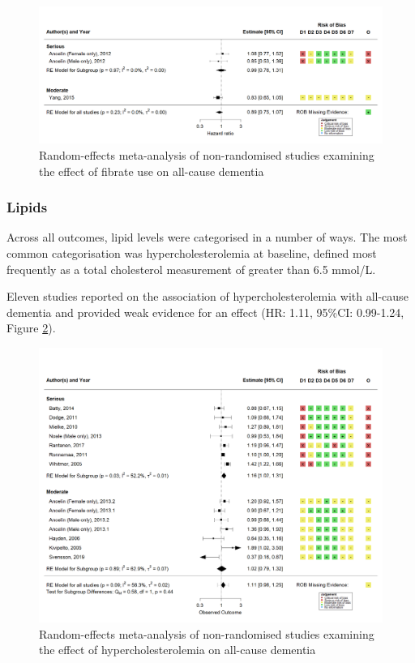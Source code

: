 \documentclass[a4paper, twoside]{templates/ociamthesis}
\begin{document}
\begin{figure}[H]
\includegraphics[width=1\linewidth]{figures/sys-rev/fp_obs_Fibrate_Dementia} \caption[Random-effects meta-analysis of statins on all-cause dementia]{Random-effects meta-analysis of non-randomised studies examining the effect of fibrate use on all-cause dementia}\label{fig:obsFibrateDementiaFig}
\end{figure}

\hypertarget{lipids}{%
\subsubsection{Lipids}\label{lipids}}

Across all outcomes, lipid levels were categorised in a number of ways. The most common categorisation was hypercholesterolemia at baseline, defined most frequently as a total cholesterol measurement of greater than 6.5 mmol/L.

Eleven studies reported on the association of hypercholesterolemia with all-cause dementia and provided weak evidence for an effect (HR: 1.11, 95\%CI: 0.99-1.24, Figure \ref{fig:obsHyperDementia}).





\begin{figure}[H]
\includegraphics[width=1\linewidth]{figures/sys-rev/fp_obs_hyperchol_Dementia} \caption[Meta-analysis of hypercholesterolemia on all-cause dementia]{Random-effects meta-analysis of non-randomised studies examining the effect of hypercholesterolemia on all-cause dementia}\label{fig:obsHyperDementia}
\end{figure}
\end{document}
